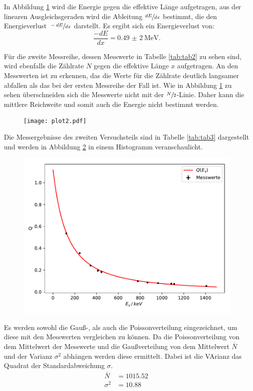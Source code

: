 In Abbildung \ref{fig:plot2} wird die Energie gegen die effektive Länge aufgetragen,
aus der linearen Ausgleichsgeraden wird die Ableitung $\sfrac{dE}{dx}$ bestimmt, die
den Energieverlust $\sfrac{-dE}{dx}$ darstellt.
Es ergibt sich ein Energieverlust von:
\begin{equation*}
  \frac{-dE}{dx}=\SI{0,49(2)}{\MeV}.
\end{equation*}

Für die zweite Messreihe, dessen Messwerte in Tabelle \ref{tab:tab2} zu
sehen sind, wird ebenfalls die Zählrate $N$ gegen die effektive Länge $x$ aufgetragen.
An den Messwerten ist zu erkennen, das die Werte für die Zählrate deutlich langsamer
abfallen als das bei der ersten Messreihe der Fall ist.
Wie in Abbildung \ref{fig:plot2} zu sehen überschneiden sich die Messwerte nicht mit
der $\sfrac{N}{2}$-Linie. Daher kann die mittlere Reichweite und somit auch
die Energie nicht bestimmt werden.

\begin{figure}[H]
  \centering
  \texttt{[image: plot2.pdf]}
  \caption{}
  \label{fig:plot2}
\end{figure}


Die Messergebnisse des zweiten Versuchsteils sind in Tabelle \ref{tab:tab3}
dargestellt und werden in Abbildung \ref{fig:plot4} in einem Histogramm
veranschaulicht.

\begin{figure}[H]
  \centering
  \includegraphics{plot4.pdf}
  \caption{}
  \label{fig:plot4}
\end{figure}

Es werden sowohl die Gauß-, als auch die Poissonverteilung eingezeichnet, um
diese mit den Messwerten vergleichen zu können.
Da die Poissonverteilung von dem Mittelwert der Messwerte und die
Gaußverteilung von dem Mittelwert $\bar{N}$ und der Varianz $\sigma^{2}$ abhängen werden diese ermittelt.
Dabei ist die VArianz das Quadrat der Standardabweichung $\sigma$.
\begin{align*}
  \bar{N}&=\SI{1015.52}{}\\
  \sigma^{2}&=\SI{10.88}{}\\
\end{align*}
